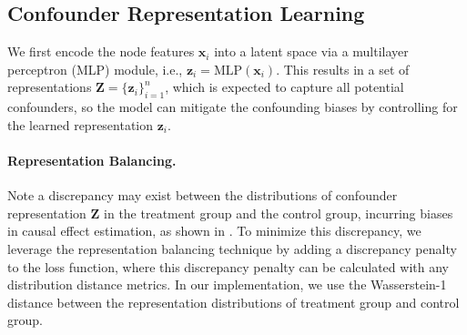 \subsection{Confounder Representation Learning}
We first encode the node features $\textbf{x}_i$ into a latent space via a multilayer perceptron (MLP) module, i.e., $\mathbf{z}_i=\text{MLP}(\mathbf{x}_i)$. This results in a set of representations $\mathbf{Z}=\{\mathbf{z}_i\}_{i=1}^n$, which is expected to capture all potential confounders, so the model can mitigate the confounding biases by controlling for the learned representation $\mathbf{z}_i$.

\paragraph{Representation Balancing.} Note a discrepancy may exist between the distributions of confounder representation $\mathbf{Z}$ in the treatment group and the control group, incurring biases in causal effect estimation, as shown in \cite{CFR,yao2018representation}. To minimize this discrepancy, we leverage the representation balancing technique by adding a discrepancy penalty to the loss function, where this discrepancy penalty can be calculated with any distribution distance metrics. In our implementation, we use the Wasserstein-1 distance \cite{CFR} between the representation distributions of treatment group and control group. 

